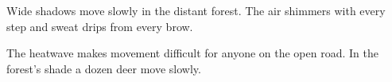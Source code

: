 \begin{boxtext}
  Wide shadows move slowly in the distant forest.
  The air shimmers with every step and sweat drips from every brow.
\end{boxtext}

The \gls{heatwave} makes movement difficult for anyone on the open road.
In the forest's shade a dozen deer move slowly.
